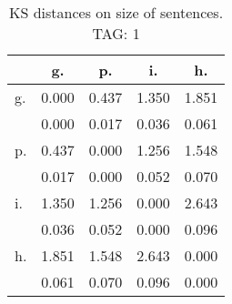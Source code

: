 \begin{table}[h!]
\begin{center}
\begin{tabular}{| l | c | c | c | c |}\hline
 & g. & p. & i. & h. \\\hline
g. & 0.000  & 0.437  & 1.350  & 1.851 \\\hline
 & 0.000  & 0.017  & 0.036  & 0.061 \\\hline
p. & 0.437  & 0.000  & 1.256  & 1.548 \\\hline
 & 0.017  & 0.000  & 0.052  & 0.070 \\\hline
i. & 1.350  & 1.256  & 0.000  & 2.643 \\\hline
 & 0.036  & 0.052  & 0.000  & 0.096 \\\hline
h. & 1.851  & 1.548  & 2.643  & 0.000 \\\hline
 & 0.061  & 0.070  & 0.096  & 0.000 \\\hline
\end{tabular}
\caption{KS distances on size of sentences. TAG: 1}
\end{center}
\end{table}